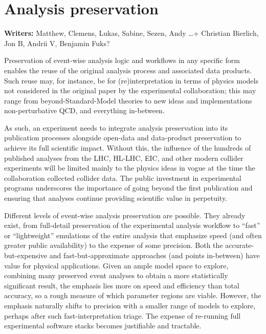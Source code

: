 \documentclass[11pt]{article}
\begin{document}
\section{Analysis preservation}
\label{analysis-preservation}

\noindent\textbf{Writers:} Matthew, Clemens, Lukas, Sabine, Sezen, Andy \dots + Christian Bierlich, Jon B, Andrii V, Benjamin Fuks?


Preservation of event-wise analysis logic and workflows in any specific form enables the reuse of the original analysis process and associated data products. Such reuse may, for instance, be for (re)interpretation in terms of physics models not considered in the original paper by the experimental collaboration; this may range from beyond-Standard-Model theories to new ideas and implementations non-perturbative QCD, and everything in-between.

As such, an experiment needs to integrate analysis preservation into its publication processes alongside open-data and data-product preservation to achieve its full scientific impact. Without this, the influence of the hundreds of published analyses from the LHC, HL-LHC, EIC, and other modern collider experiments will be limited mainly to the physics ideas in vogue at the time the collaboration collected collider data. The public investment in experimental programs underscores the importance of going beyond the first publication and ensuring that analyses continue providing scientific value in perpetuity.

Different levels of event-wise analysis preservation are possible. They already exist, from full-detail preservation of the experimental analysis workflow to ``fast'' or ``lightweight'' emulations of the entire analysis that emphasize speed (and often greater public availability) to the expense of some precision. Both the accurate-but-expensive and fast-but-approximate approaches (and points in-between) have value for physical applications. Given an ample model space to explore, combining many preserved event analyses to obtain a more statistically significant result, the emphasis lies more on speed and efficiency than total accuracy, so a rough measure of which parameter regions are viable. However, the emphasis naturally shifts to precision with a smaller range of models to explore, perhaps after such fast-interpretation triage. The expense of re-running full experimental software stacks becomes justifiable and tractable.
\end{document}
